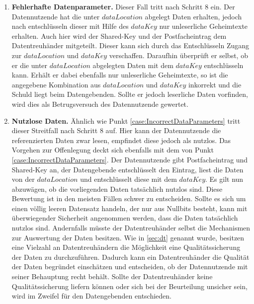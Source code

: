 \documentclass{scrreprt}
\begin{document}
\begin{enumerate}
    
    \item \textbf{Fehlerhafte Datenparameter.}\label{case:IncorrectDataParameters}
    Dieser Fall tritt nach Schritt 8 ein. Der Datennutzende hat die unter $dataLocation$ abgelegt Daten erhalten, jedoch nach entschlüsseln dieser mit Hilfe des $dataKey$ nur unleserliche Geheimtexte erhalten. Auch hier wird der Shared-Key und der Postfacheintrag dem Datentreuhänder mitgeteilt. Dieser kann sich durch das Entschlüsseln Zugang zur $dataLocation$ und $dataKey$ verschaffen. Daraufhin überprüft er selbst, ob er die unter $dataLocation$ abgelegten Daten mit dem $dataKey$ entschlüsseln kann. Erhält er dabei ebenfalls nur unleserliche Geheimtexte, so ist die angegebene Kombination aus $dataLocation$ und $dataKey$ inkorrekt und die Schuld liegt beim Datengebenden. Sollte er jedoch leserliche Daten vorfinden, wird dies als Betrugsversuch des Datennutzende gewertet.

    \item \textbf{Nutzlose Daten.}\label{case:UselessData}
    Ähnlich wie Punkt \ref{case:IncorrectDataParameters} tritt dieser Streitfall nach Schritt 8 auf. Hier kann der Datennutzende die referenzierten Daten zwar lesen, empfindet diese jedoch als nutzlos. Das Vorgehen zur Offenlegung deckt sich ebenfalls mit dem von Punkt \ref{case:IncorrectDataParameters}. Der Datennutzende gibt Postfacheintrag und Shared-Key an, der Datengebende entschlüsselt den Eintrag, liest die Daten von der $dataLocation$ und entschlüsselt diese mit dem $dataKey$. Es gilt nun abzuwägen, ob die vorliegenden Daten tatsächlich nutzlos sind. Diese Bewertung ist in den meisten Fällen schwer zu entscheiden. Sollte es sich um einen völlig leeren Datensatz handeln, der nur aus Nullbits besteht, kann mit überwiegender Sicherheit angenommen werden, dass die Daten tatsächlich nutzlos sind. Andernfalls müsste der Datentreuhänder selbst die Mechanismen zur Auswertung der Daten besitzen. Wie in \ref{sec:dt} genannt wurde, besitzen eine Vielzahl an Datentreuhändern die Möglichkeit eine Qualitätssicherung der Daten zu durchzuführen. Dadurch kann ein Datentreuhänder die Qualität der Daten begründet einschätzen und entscheiden, ob der Datennutzende mit seiner Behauptung recht behält. Sollte der Datentreuhänder keine Qualitätssicherung liefern können oder sich bei der Beurteilung unsicher sein, wird im Zweifel für den Datengebenden entschieden.


\end{enumerate}
\end{document}
